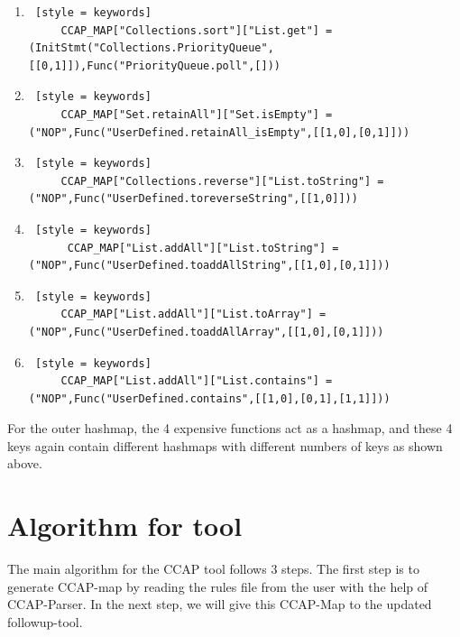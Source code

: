 \begin{enumerate} [blt]
    \item \begin{lstlisting} [style = keywords]
     CCAP_MAP["Collections.sort"]["List.get"] = (InitStmt("Collections.PriorityQueue",[[0,1]]),Func("PriorityQueue.poll",[])) \end{lstlisting}
     
     \item \begin{lstlisting} [style = keywords]
     CCAP_MAP["Set.retainAll"]["Set.isEmpty"] = ("NOP",Func("UserDefined.retainAll_isEmpty",[[1,0],[0,1]])) \end{lstlisting}
     
     \item \begin{lstlisting} [style = keywords]
     CCAP_MAP["Collections.reverse"]["List.toString"] = ("NOP",Func("UserDefined.toreverseString",[[1,0]])) \end{lstlisting}
     
     \item \begin{lstlisting} [style = keywords]
      CCAP_MAP["List.addAll"]["List.toString"] = ("NOP",Func("UserDefined.toaddAllString",[[1,0],[0,1]])) \end{lstlisting}
      
     \item \begin{lstlisting} [style = keywords]
     CCAP_MAP["List.addAll"]["List.toArray"] = ("NOP",Func("UserDefined.toaddAllArray",[[1,0],[0,1]])) \end{lstlisting}
     
     \item \begin{lstlisting} [style = keywords]
     CCAP_MAP["List.addAll"]["List.contains"] = ("NOP",Func("UserDefined.contains",[[1,0],[0,1],[1,1]])) \end{lstlisting}

\end{enumerate}

For the outer hashmap, the 4 expensive functions act as a hashmap, and these 4 keys again contain different hashmaps with different numbers of keys as shown above.

\section{Algorithm for tool}
The main algorithm for the CCAP tool follows 3 steps. The first step is to generate CCAP-map by reading the rules file from the user with the help of CCAP-Parser. In the next step, we will give this CCAP-Map to the updated followup-tool.

